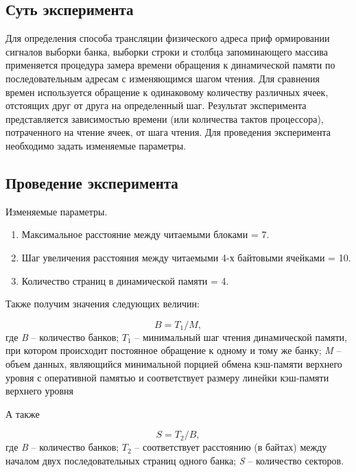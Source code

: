 \subsection{Суть эксперимента}  
Для определения способа трансляции физического адреса приф ормировании сигналов выборки банка, выборки строки и столбца запоминающего массива применяется   процедура   замера   времени   обращения   к   динамической   памяти   по последовательным   адресам   с   изменяющимся   шагом   чтения.   Для   сравнения   времен используется обращение к одинаковому количеству различных ячеек,  отстоящих друг от друга   на   определенный шаг. Результат эксперимента представляется зависимостью времени (или количества тактов процессора), потраченного на чтение ячеек, от шага чтения. Для проведения эксперимента необходимо задать изменяемые параметры.


\subsection{Проведение эксперимента}

Изменяемые параметры.

\begin{enumerate}
	\item Максимальное расстояние между читаемыми блоками = 7.
	\item Шаг увеличения расстояния между читаемыми 4-х байтовыми ячейками = 10.
	\item Количество страниц в динамической памяти = 4.
\end{enumerate}




\clearpage


Также получим значения следующих величин:

\begin{equation}
	B = T_1 / M,
\end{equation}
где \textit{B} -- количество банков; $T_1$ -- минимальный шаг чтения динамической памяти, при котором происходит постоянное обращение к одному и тому же банку; \textit{M} -- объем данных, являющийся минимальной порцией обмена кэш-памяти верхнего уровня с оперативной памятью и соответствует размеру линейки кэш-памяти верхнего уровня


А также

\begin{equation}
	S = T_2 / B,
\end{equation}
где \textit{B} -- количество банков; $T_2$ -- соответствует расстоянию (в байтах) между началом двух последовательных страниц одного банка; \textit{S} -- количество секторов.



